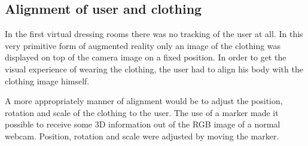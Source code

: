 \documentclass[a4paper]{article}
\begin{document}
\subsection{Alignment of user and clothing}

In the first virtual dressing rooms there was no tracking of the user at all. In this very primitive form of augmented reality only an image of the clothing was displayed on top of the camera image on a fixed position. In order to get the visual experience of wearing the clothing, the user had to align his body with the clothing image himself. 

A more appropriately manner of alignment would be to adjust the position, rotation and scale of the clothing to the user. The use of a marker made it possible to receive some 3D information out of the RGB image of a normal webcam. Position, rotation and scale were adjusted by moving the marker.
\end{document}

